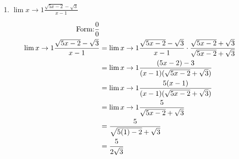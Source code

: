 \documentclass{ximera}
\begin{document}
\begin{problem}
\begin{enumerate}
	
	\item  $ \displaystyle \lim{x \to 1} \frac{\sqrt{5x-2} - \sqrt{3}}{x-1} $
\begin{explanation}
	\begin{align*}
	\text{Form:} \dfrac{0}{0}\\
	\displaystyle \lim{x \to 1} \frac{\sqrt{5x-2} - \sqrt{3}}{x-1} &= \displaystyle \lim{x \to 1} \frac{\sqrt{5x-2} - \sqrt{3}}{x-1} \cdot \frac{\sqrt{5x-2} + \sqrt{3}}{\sqrt{5x-2} + \sqrt{3}} \\
	&= \displaystyle \lim{x \to 1} \frac{(5x-2)-3}{(x-1)(\sqrt{5x-2} + \sqrt{3})} \\
	&= \displaystyle \lim{x \to 1} \frac{5(x-1)}{(x-1)(\sqrt{5x-2} + \sqrt{3})} \\
	&= \displaystyle \lim{x \to 1} \frac{5}{\sqrt{5x-2} + \sqrt{3}} \\
	&=   \frac{5}{\sqrt{5(1)-2} + \sqrt{3}} \\
	&= \frac{5}{2 \sqrt{3}} 
	\end{align*}
	\end{explanation}
	\end{enumerate}
\end{problem}
\end{document}
